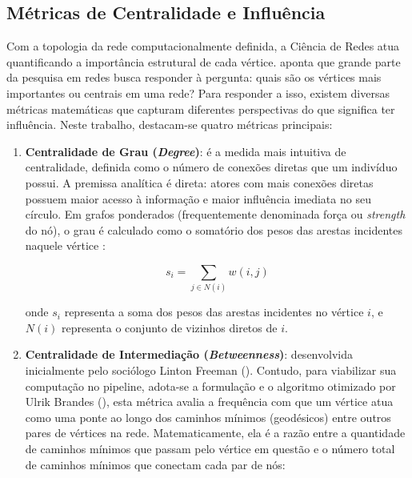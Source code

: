 \documentclass[
      12pt,
      a4paper,
      openright,
      oneside,
      chapter=TITLE,
      section=TITLE,
      english,
      french,
      spanish,
      brazilian
    ]{abntex2}
\begin{document}
    \subsection{Métricas de Centralidade e Influência}
    \label{subsec:metricas}
    
    Com a topologia da rede computacionalmente definida, a Ciência de Redes atua quantificando a importância estrutural de cada vértice.  aponta que grande parte da pesquisa em redes busca responder à pergunta: quais são os vértices mais importantes ou centrais em uma rede? Para responder a isso, existem diversas métricas matemáticas que capturam diferentes perspectivas do que significa ter influência. Neste trabalho, destacam-se quatro métricas principais:
    
    \begin{enumerate}[label=\alph*)]
        \item \textbf{Centralidade de Grau (\textit{Degree})}: é a medida mais intuitiva de centralidade, definida como o número de conexões diretas que um indivíduo possui. A premissa analítica é direta: atores com mais conexões diretas possuem maior acesso à informação e maior influência imediata no seu círculo. Em grafos ponderados (frequentemente denominada força ou \textit{strength} do nó), o grau é calculado como o somatório dos pesos das arestas incidentes naquele vértice \cite{newman2004, newman2010}:
    
        \begin{equation}
        s_i = \sum_{j \in N(i)} w(i,j)
        \label{eq:grau_ponderado}
        \end{equation}
    
        onde $s_i$ representa a soma dos pesos das arestas incidentes no vértice $i$, e $N(i)$ representa o conjunto de vizinhos diretos de $i$.
    
        \item \textbf{Centralidade de Intermediação (\textit{Betweenness})}: desenvolvida inicialmente pelo sociólogo Linton Freeman (\citeyear{freeman1977}). Contudo, para viabilizar sua computação no pipeline, adota-se a formulação e o algoritmo otimizado por Ulrik Brandes (\citeyear{brandes2001}), esta métrica avalia a frequência com que um vértice atua como uma ponte ao longo dos caminhos mínimos (geodésicos) entre outros pares de vértices na rede. Matematicamente, ela é a razão entre a quantidade de caminhos mínimos que passam pelo vértice em questão e o número total de caminhos mínimos que conectam cada par de nós:
    

\end{enumerate}
\end{document}
